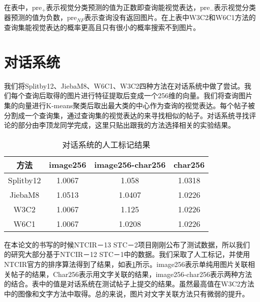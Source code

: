 在表中，pre$_{+}$表示视觉分类预测的值为正数即查询能视觉表达，pre$_{-}$表示视觉分类器预测的值为负数，pre$_{NF}$表示查询没有返回图片。在上表中W3C2和W6C1方法的查询集能视觉表达的概率更高且只有很小的概率搜索不到图片。

\section{对话系统}
我们将Splitby12、JiebaM8、W6C1、W3C2四种方法在对话系统中做了尝试。我们每个查询后取得的图片进行特征提取后变成一个256维的向量。我们将查询图片集的向量进行K-means聚类后取出最大类的中心作为查询的视觉表达。每个帖子被分割成一个查询集，通过查询集的视觉表达的来寻找相似的帖子。对话系统寻找评论的部分由李顶龙同学完成，这里只贴出跟我的方法选择相关的实验结果。

\begin{table}[htbp]
\centering
\caption{对话系统的人工标记结果} \label{tab:STC_result}
\begin{tabular}{ |c|c|c|c|}
    \hline
		方法 & image256 & image256-char256 & char256\\
	\hline 
		Splitby12 & 1.0067 & 1.058 & 1.0318 \\
	\hline 
		JiebaM8 & 1.0513 & 1.0407 & 1.0226  \\
	\hline
		W3C2 & 1.0067 & 1.125 & 1.0226  \\
	\hline 
		W6C1 & 1.0067 & 1.0208 & 1.0226\\
 	\hline
\end{tabular}
\end{table}

在本论文的书写的时候NTCIR－13 STC－2项目刚刚公布了测试数据，所以我们的研究大部分基于NTCIR－12 STC－1中的数据。我们采取了人工标记，并使用NTCIR官方的排序算法得到了结果，如表\ref{tab:STC_result}所示。image256表示单纯用图片关联相关帖子的结果，Char256表示用文字关联的结果，image256-char256表示两种方法的结合。表中的值是对话系统在测试帖子上提交的结果。虽然最高值在W3C2方法中的图像和文字方法中取得。总的来说，图片对文字关联方法只有微弱的提升。



